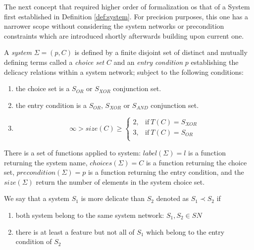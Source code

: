 The next concept that required higher order of formalization os that of a System first established in Definition \ref{def:system}. For precision purposes, this one has a narrower scope without considering the system networks or precondition constraints which are introduced shortly afterwards building upon current one.

\begin{definition}[System]\label{def:formal-system}
A \textit{system} $\Sigma=(p,C)$ is defined by a finite disjoint set of distinct and mutually defining terms called a \textit{choice set} $C$ and an \textit{entry condition} $p$ establishing the delicacy relations within a system network; subject to the following conditions: 
\begin{enumerate}
	\item the choice set is a $S_{OR}$ or $S_{XOR}$ conjunction set.
	\item the entry condition is a $S_{OR}$, $S_{XOR}$ or $S_{AND}$ conjunction set.
	\item \begin{equation*}
	\infty > size(C) \geq
	\begin{cases}
	2, & \text{if}\ T(C) = S_{XOR} \\
	3, & \text{if}\ T(C) = S_{OR} \\
	\end{cases}
	\end{equation*}
\end{enumerate} 
\end{definition}

There is a set of functions applied to system: $label(\Sigma)=l$ is a function returning the system name, $choices(\Sigma)=C$ is a function returning the choice set, $precondition(\Sigma)=p$ is a function returning the entry condition, and the $size(\Sigma)$ return the number of elements in the system choice set.  

\begin{definition}\label{def:delicacy-hierarchy}
	We say that a system $S_{1}$ is more delicate than $S_{2}$ denoted as $S_{1} \prec S_{2}$ if 
	\begin{enumerate}
		\item both system belong to the same system network: $S_{1}, S_{2} \in SN$ 
		\item there is at least a feature but not all of $S_{1}$ which belong to the entry condition of $S_{2}$  
	\end{enumerate} 
\end{definition}

